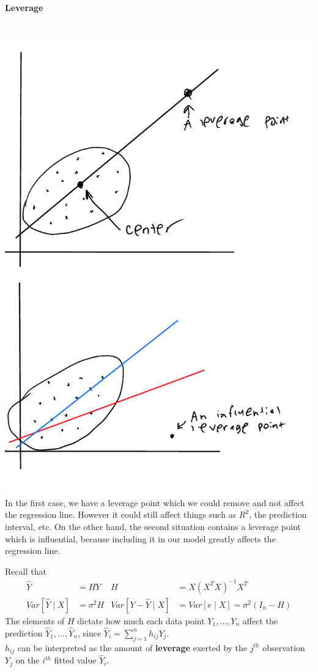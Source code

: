 \documentclass[12 pt]{article}
\begin{document}
\paragraph{Leverage}
~\\\includegraphics[width=.5\textwidth]{33.pdf}
\\ In the first case, we have a leverage point which we could remove
and not affect the regression line. However it could still affect
things such as $R^2$, the prediction interval, etc. On the other hand,
the second situation contains a leverage point which is influential,
because including it in our model greatly affects the regression line.

Recall that
\begin{align*}
  \hat{Y} & = HY & H & = X(X^TX)^{-1}X^T
  \\ Var[\hat{Y} \mid X] & = \sigma^2 H & Var[Y - \hat{Y} \mid X] & = Var[e \mid X] = \sigma^2 (I_n - H)
\end{align*}
The elements of $H$ dictate how much each data point $Y_1, \ldots,
Y_n$ affect the prediction $\hat{Y}_1, \ldots, \hat{Y}_n$, since
$\hat{Y}_i = \sum_{j=1}^n h_{ij}Y_j$.
\\ $h_{ij}$ can be interpreted as the amount of \textbf{leverage}
exerted by the $j^{th}$ observation $Y_j$ on the $i^{th}$ fitted value
$\hat{Y}_i$.
\end{document}

